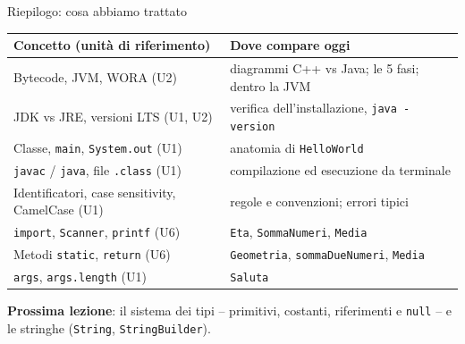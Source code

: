 \documentclass[10pt,aspectratio=169]{beamer}
\begin{document}
\begin{frame}{Riepilogo: cosa abbiamo trattato}
\small
\begin{center}
\renewcommand{\arraystretch}{1.3}
\begin{tabular}{|l|l|}
\hline
\textbf{Concetto (unità di riferimento)} & \textbf{Dove compare oggi} \\
\hline
Bytecode, JVM, WORA (U2) & diagrammi C++ vs Java; le 5 fasi; dentro la JVM \\
\hline
JDK vs JRE, versioni LTS (U1, U2) & verifica dell'installazione, \texttt{java -version} \\
\hline
Classe, \texttt{main}, \texttt{System.out} (U1) & anatomia di \texttt{HelloWorld} \\
\hline
\texttt{javac} / \texttt{java}, file \texttt{.class} (U1) & compilazione ed esecuzione da terminale \\
\hline
Identificatori, case sensitivity, CamelCase (U1) & regole e convenzioni; errori tipici \\
\hline
\texttt{import}, \texttt{Scanner}, \texttt{printf} (U6) & \texttt{Eta}, \texttt{SommaNumeri}, \texttt{Media} \\
\hline
Metodi \texttt{static}, \texttt{return} (U6) & \texttt{Geometria}, \texttt{sommaDueNumeri}, \texttt{Media} \\
\hline
\texttt{args}, \texttt{args.length} (U1) & \texttt{Saluta} \\
\hline
\end{tabular}
\end{center}

\vspace{0.3cm}
\textbf{Prossima lezione}: il sistema dei tipi -- primitivi, costanti, riferimenti e \texttt{null} -- e le stringhe (\texttt{String}, \texttt{StringBuilder}).
\end{frame}
\end{document}
